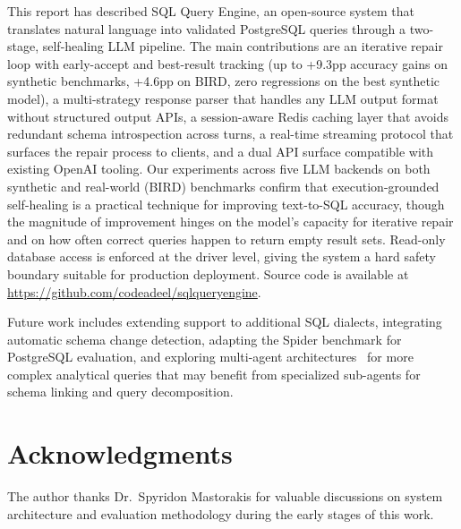 \documentclass{article}
\begin{document}
This report has described SQL Query Engine, an open-source system that translates natural language into validated PostgreSQL queries through a two-stage, self-healing LLM pipeline. The main contributions are an iterative repair loop with early-accept and best-result tracking (up to +9.3pp accuracy gains on synthetic benchmarks, +4.6pp on BIRD, zero regressions on the best synthetic model), a multi-strategy response parser that handles any LLM output format without structured output APIs, a session-aware Redis caching layer that avoids redundant schema introspection across turns, a real-time streaming protocol that surfaces the repair process to clients, and a dual API surface compatible with existing OpenAI tooling. Our experiments across five LLM backends on both synthetic and real-world (BIRD) benchmarks confirm that execution-grounded self-healing is a practical technique for improving text-to-SQL accuracy, though the magnitude of improvement hinges on the model's capacity for iterative repair and on how often correct queries happen to return empty result sets. Read-only database access is enforced at the driver level, giving the system a hard safety boundary suitable for production deployment. Source code is available at \url{https://github.com/codeadeel/sqlqueryengine}.

Future work includes extending support to additional SQL dialects, integrating automatic schema change detection, adapting the Spider benchmark for PostgreSQL evaluation, and exploring multi-agent architectures~\citep{macsql2023} for more complex analytical queries that may benefit from specialized sub-agents for schema linking and query decomposition.


\section*{Acknowledgments}

The author thanks Dr.\ Spyridon Mastorakis for valuable discussions on system architecture and evaluation methodology during the early stages of this work.




\end{document}
